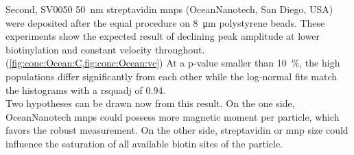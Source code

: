 \clearpage
Second, SV0050 \SI{50}{\nano\meter} streptavidin \glspl{mnp} (OceanNanotech, San Diego, USA) were deposited after the equal procedure on \SI{8}{\micro\meter} polystyrene beads. These experiments show the expected result of declining peak amplitude at lower biotinylation and constant velocity throughout. (\cref{fig:conc:Ocean:C,fig:conc:Ocean:vc}) At a p-value smaller than \SI{10}{\percent}, the high populations differ significantly from each other while the log-normal fits match the histograms with a \gls{rsquadj} of \num{0.94}.\\
Two hypotheses can be drawn now from this result. On the one side, OceanNanotech \glspl{mnp} could possess more magnetic moment per particle, which favors the robust measurement. On the other side, streptavidin or \gls{mnp} size could influence the saturation of all available biotin sites of the particle. 

